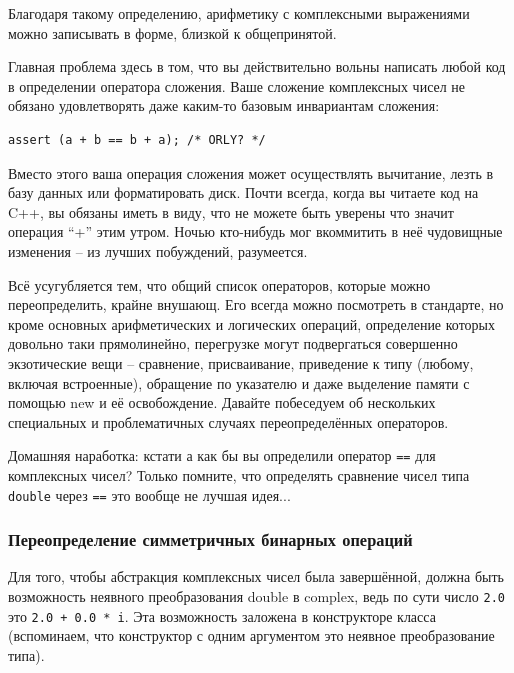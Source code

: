 \documentclass[a4paper,12pt,oneside]{article}
\begin{document}


Благодаря такому определению, арифметику с комплексными выражениями можно записывать в форме, близкой к общепринятой.



Главная проблема здесь в том, что вы действительно вольны написать любой код в определении оператора сложения. Ваше сложение комплексных чисел не обязано удовлетворять даже каким-то базовым инвариантам сложения:

\begin{lstlisting}
assert (a + b == b + a); /* ORLY? */
\end{lstlisting}

Вместо этого ваша операция сложения может осуществлять вычитание, лезть в базу данных или форматировать диск. Почти всегда, когда вы читаете код на C++, вы обязаны иметь в виду, что не можете быть уверены что значит операция ``+'' этим утром. Ночью кто-нибудь мог вкоммитить в неё чудовищные изменения – из лучших побуждений, разумеется.

Всё усугубляется тем, что общий список операторов, которые можно переопределить, крайне внушающ. Его всегда можно посмотреть в стандарте, но кроме основных арифметических и логических операций, определение которых довольно таки прямолинейно, перегрузке могут подвергаться совершенно экзотические вещи – сравнение, присваивание, приведение к типу (любому, включая встроенные), обращение по указателю и даже выделение памяти с помощью new и её освобождение. Давайте побеседуем об нескольких специальных и проблематичных случаях переопределённых операторов.

Домашняя наработка: кстати а как бы вы определили оператор \lstinline!==! для комплексных чисел? Только помните, что определять сравнение чисел типа \lstinline!double! через \lstinline!==! это вообще не лучшая идея...

\subsubsection{Переопределение симметричных бинарных операций}

Для того, чтобы абстракция комплексных чисел была завершённой, должна быть возможность неявного преобразования double в complex, ведь по сути число \lstinline!2.0! это \lstinline!2.0 + 0.0 * i!. Эта возможность заложена в конструкторе класса (вспоминаем, что конструктор с одним аргументом это неявное преобразование типа).
\end{document}
